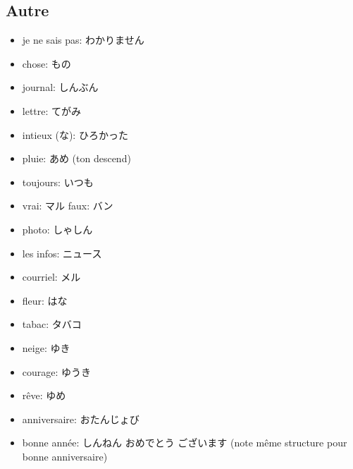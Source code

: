 \documentclass{article}
\begin{document}
\begin{CJK}{UTF8}{min}
    \subsection{Autre}
    \begin{itemize}
        \item je ne sais pas: わかりません
        \item chose: もの
        \item journal: しんぶん
        \item lettre: てがみ
        \item intieux (な): ひろかった
        \item pluie: あめ (ton descend)
        \item toujours: いつも
        \item vrai: マル faux: バン
        \item photo: しゃしん
        \item les infos: ニュース
        \item courriel: メル
        \item fleur: はな
        \item tabac: タバコ
        \item neige: ゆき
        \item courage: ゆうき
        \item rêve: ゆめ
        \item anniversaire: おたんじょび
        \item bonne année: しんねん おめでとう ございます (note même structure pour bonne anniversaire)

    \end{itemize}
\end{CJK}
\end{document}

